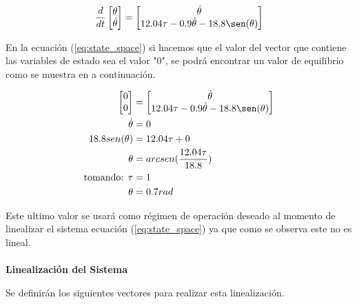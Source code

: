 \documentclass[12pt]{article}
\begin{document}
\begin{equation}
    \frac{d}{dt}
    \begin{bmatrix}
        \theta  \\
        \dot{\theta} \\ 
    \end{bmatrix}=\begin{bmatrix}
        \dot{\theta}  \\
        12.04\tau-0.9\dot{\theta}-18.8\sen(\theta) \\ 
    \end{bmatrix}
    \label{eq:state_space}
\end{equation}

En la ecuación (\ref{eq:state_space}) si hacemos que el valor del vector que contiene las variables de estado sea el valor "$0$", se podrá encontrar un valor de equilibrio como se muestra en a continuación.

\begin{equation}
    \begin{split}
        \begin{bmatrix}
            0  \\
            0  \\ 
        \end{bmatrix}&=\begin{bmatrix}
            \dot{\theta}  \\
            12.04\tau-0.9\dot{\theta}-18.8\sen(\theta) \\ 
        \end{bmatrix}\\
        \dot{\theta}&=0\\
        18.8sen(\theta)&=12.04\tau+0\\
        \theta&=arcsen(\frac{12.04\tau}{18.8})\\
        \text{tomando: } \tau&=1 \\
        \theta&=0.7rad\\
    \end{split}
    \label{eq:equilibrium}
\end{equation}

Este ultimo valor se usará como régimen de operación deseado al momento de linealizar el sistema ecuación  (\ref{eq:state_space}) ya que como se observa este no es lineal.
\\
\\
\textbf{Linealización del Sistema}

Se definirán los siguientes vectores para realizar esta linealización.
\end{document}
